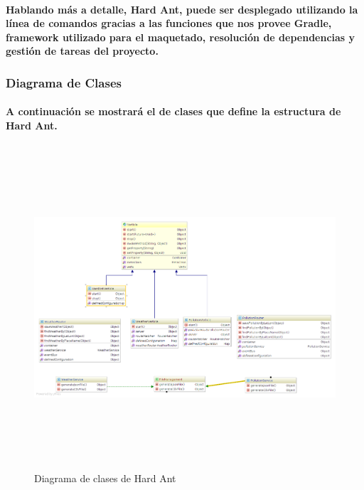       \paragraph{Hablando más a detalle, Hard Ant, puede ser desplegado utilizando la línea de comandos gracias a las funciones que nos provee Gradle, framework utilizado para el maquetado, resolución de dependencias y gestión de tareas del proyecto. \cite{34}}
      \newpage
        \begin{landscape}
          \subsubsection{Diagrama de Clases}
          \paragraph{A continuación se mostrará el de clases que define la estructura de Hard Ant.}
          \begin{figure}[b!]
          \centering
          \includegraphics[width=17.5cm,height=12cm]{./images/HardAntClassDiagram.png}
          \caption{Diagrama de clases de Hard Ant}
        \end{figure}
        \end{landscape}
      \newpage
      \newpage
